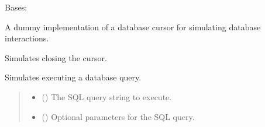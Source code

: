 \documentclass[letterpaper,10pt,english]{sphinxmanual}
\begin{document}
\begin{fulllineitems}
\label{\detokenize{test.data_storage:test.data_storage.test_llm_standardize.DummyCursor}}
\pysigstartsignatures
\pysigline
{}
\pysigstopsignatures
\sphinxAtStartPar
Bases: 

\sphinxAtStartPar
A dummy implementation of a database cursor for simulating database interactions.

\begin{fulllineitems}
\label{\detokenize{test.data_storage:test.data_storage.test_llm_standardize.DummyCursor.close}}
\pysigstartsignatures
\pysiglinewithargsret
{}
{}
{}
\pysigstopsignatures
\sphinxAtStartPar
Simulates closing the cursor.

\end{fulllineitems}


\begin{fulllineitems}
\label{\detokenize{test.data_storage:test.data_storage.test_llm_standardize.DummyCursor.execute}}
\pysigstartsignatures
\pysiglinewithargsret
{}
{\sphinxparamcomma {}}
{}
\pysigstopsignatures
\sphinxAtStartPar
Simulates executing a database query.
\begin{quote}\begin{description}
\begin{itemize}
\item {} 
\sphinxAtStartPar
{} () \textendash{} The SQL query string to execute.

\item {} 
\sphinxAtStartPar
{} (\sphinxstyleliteralemphasis{\sphinxupquote{, }}) \textendash{} Optional parameters for the SQL query.

\end{itemize}

\end{description}\end{quote}

\end{fulllineitems}


\end{fulllineitems}
\end{document}
